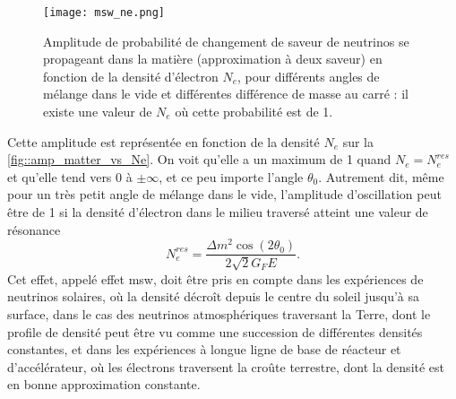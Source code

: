             \begin{figure}
            	\texttt{[image: msw\_ne.png]}
            	\caption[Effet de résonnance \gls{msw}]{\label{fig::amp_matter_vs_Ne}Amplitude de probabilité de changement de saveur de neutrinos se propageant dans la matière (approximation à deux saveur) en fonction de la densité d'électron $N_e$, pour différents angles de mélange dans le vide et différentes différence de masse au carré : il existe une valeur de $N_e$ où cette probabilité est de 1.}
            \end{figure}
            Cette amplitude est représentée en fonction de la densité $N_e$ sur la \autoref{fig::amp_matter_vs_Ne}. On voit qu'elle a un maximum de 1 quand $N_e = N_e^{res}$ et qu'elle tend vers 0 à $\pm\infty$, et ce peu importe l'angle $\theta_0$. Autrement dit, même pour un très petit angle de mélange dans le vide, l'amplitude d'oscillation peut être de 1 si la densité d'électron dans le milieu traversé atteint une valeur de résonance
            \begin{equation}\label{eq::MSW_condition}
                N_e^{res}=\frac{\Delta m^2\cos(2\theta_0)}{2\sqrt{2}G_F E}.%
            \end{equation}
            Cet effet, appelé effet \gls{msw}, doit être pris en compte dans les expériences de neutrinos solaires, où la densité décroît depuis le centre du soleil jusqu'à sa surface, dans le cas des neutrinos atmosphériques traversant la Terre, dont le profile de densité peut être vu comme une succession de différentes densités constantes, et dans les expériences à longue ligne de base de réacteur et d'accélérateur, où les électrons traversent la croûte terrestre, dont la densité est en bonne approximation constante.
            
            
